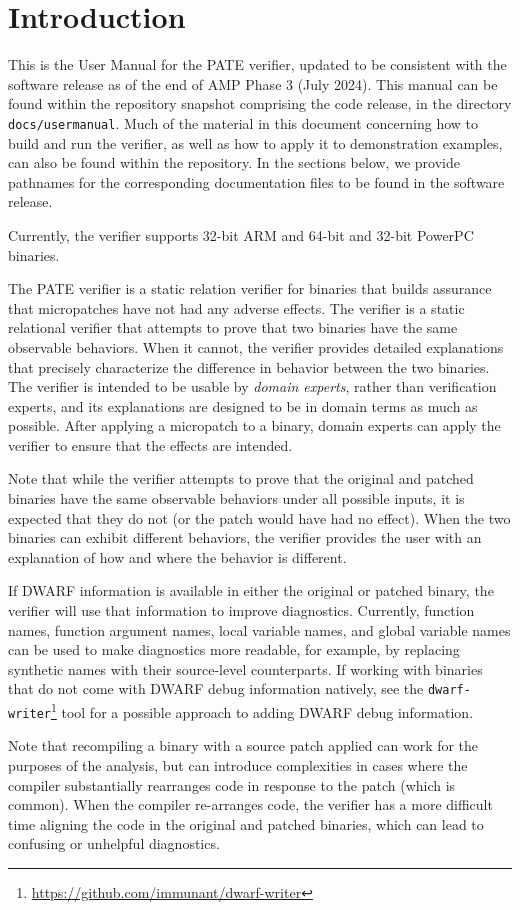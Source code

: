 \section{Introduction}\label{sec:introduction}

This is the User Manual for the PATE verifier, updated to be consistent with the software release as of the end of AMP Phase 3 (July 2024).
This manual can be found within the repository snapshot comprising the code release, in the directory \texttt{docs/usermanual}.
Much of the material in this document concerning how to build and run the verifier, as well as how to apply it to demonstration examples, can also be found within the repository.
In the sections below, we provide pathnames for the corresponding documentation files to be found in the software release.

Currently, the verifier supports 32-bit ARM and 64-bit and 32-bit PowerPC binaries.

The PATE verifier is a static relation verifier for binaries that builds assurance that micropatches have not had any adverse effects.
The verifier is a static relational verifier that attempts to prove that two binaries have the same observable behaviors.
When it cannot, the verifier provides detailed explanations that precisely characterize the difference in behavior between the two binaries.
The verifier is intended to be usable by \emph{domain experts}, rather than verification experts, and its explanations are designed to be in domain terms as much as possible.
After applying a micropatch to a binary, domain experts can apply the verifier to ensure that the effects are intended.

Note that while the verifier attempts to prove that the original and patched binaries have the same observable behaviors under all possible inputs, it is expected that they do not (or the patch would have had no effect).
When the two binaries can exhibit different behaviors, the verifier provides the user with an explanation of how and where the behavior is different.

If DWARF information is available in either the original or patched binary, the verifier will use that information to improve diagnostics.
Currently, function names, function argument names, local variable names, and global variable names can be used to make diagnostics more readable, for example, by replacing synthetic names with their source-level counterparts.
If working with binaries that do not come with DWARF debug information natively, see the \lstinline{dwarf-writer}\footnote{\url{https://github.com/immunant/dwarf-writer}} tool for a possible approach to adding DWARF debug information.

Note that recompiling a binary with a source patch applied can work for the purposes of the analysis, but can introduce complexities in cases where the compiler substantially rearranges code in response to the patch (which is common).
When the compiler re-arranges code, the verifier has a more difficult time aligning the code in the original and patched binaries, which can lead to confusing or unhelpful diagnostics.

